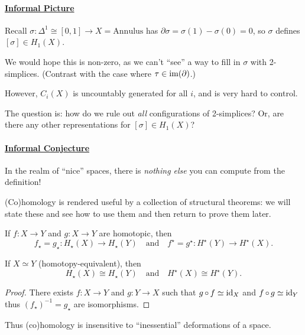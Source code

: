 \documentclass[a4paper,11pt]{article}
\begin{document}
	\paragraph{\underline{Informal Picture}} 
	Recall $\sigma : \Delta^1 \cong [0,1] \to X = \text{Annulus}$ has $\partial \sigma = \sigma(1) - \sigma(0) = 0$, so $\sigma$ defines $[\sigma]\in H_1(X)$.
	

	We would hope this is non-zero, as we can't ``see'' a way to fill in $\sigma$ with 2-simplices. (Contrast with the case where $\tau \in \operatorname{im}(\partial)$.)


	However, $C_i(X)$ is uncountably generated for all $i$, and is very hard to control.

	The question is: how do we rule out \emph{all} configurations of 2-simplices? Or, are there any other representations for $[\sigma]\in H_1(X)$? 

	\paragraph{\underline{Informal Conjecture}} In the realm of ``nice'' spaces, there is \emph{nothing else} you can compute from the definition!

	(Co)homology is rendered useful by a collection of structural theorems: we will state these and see how to use them and then return to prove them later.

	\begin{thm}
		If $f : X \to Y$ and $g: X \to Y$ are homotopic, then 
		\[
			f_\star = g_\star : H_\star(X) \to H_\star(Y) \quad \text{and} \quad f^\star = g^\star : H^\star(Y) \to H^\star(X).
		\]
	\end{thm}

	\begin{cor}
		If $X \simeq Y$ (homotopy-equivalent), then 
		\[
			H_\star (X) \cong H_\star (Y) \quad \text{and} \quad H^\star(X) \cong H^\star(Y).
		\]
	\end{cor}

	\begin{proof}
		There exists $f: X \to Y$ and $g : Y\to X$ such that $g \operatorname{\circ} f \simeq \operatorname{id}_X$ and $f \operatorname{\circ} g \simeq \operatorname{id}_Y$ thus $(f_\star)^{-1} = g_\star$ are isomorphisms.
	\end{proof}

	Thus (co)homology is insensitive to ``inessential'' deformations of a space.
\end{document}
